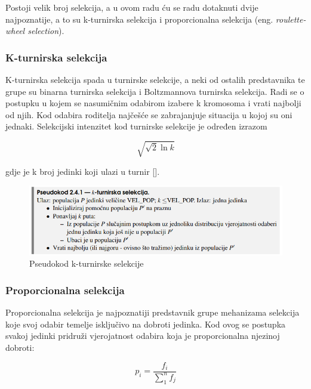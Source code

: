 \documentclass[times, utf8, zavrsni]{fer}
\begin{document}
	Postoji velik broj selekcija, a u ovom radu ću se radu dotaknuti dvije najpoznatije, a to su k-turnirska selekcija i proporcionalna selekcija (eng. \emph{roulette-wheel selection}).
	
	\subsubsection{K-turnirska selekcija}
	K-turnirska selekcija spada u turnirske selekcije, a neki od ostalih predstavnika te grupe su binarna turnirska selekcija i Boltzmannova turnirska selekcija.
	Radi se o postupku u kojem se nasumičnim odabirom izabere k kromosoma i vrati najbolji od njih. Kod odabira roditelja najčešće se zabrajanjuje situacija u kojoj su oni jednaki. Selekcijski intenzitet kod turnirske selekcije je određen izrazom 
	
	\begin{equation}
		\sqrt{\sqrt{2} \ln{k}}
	\end{equation}
	
	gdje je k broj jedinki koji ulazi u turnir [\citep{Back1995}]. 
	
	\begin{figure}[!htb]
		\centering
		\includegraphics[width=15cm]{slike/kTourSelect.png}
		\caption{Pseudokod k-turnirske selekcije}
		\label{fig:k-tour-select}
	\end{figure}
	
	
	\subsubsection{Proporcionalna selekcija}
	\label{proportional-sel}
	Proporcionalna selekcija je najpoznatiji predstavnik grupe mehanizama selekcija koje svoj odabir temelje isključivo na dobroti jedinka. Kod ovog se postupka svakoj jedinki pridruži vjerojatnost odabira koja je proporcionalna njezinoj dobroti:
	
	\begin{equation}
		p_i=\frac{f_i}{\sum_{1}^{n}f_j}
	\end{equation}
	
\end{document}
